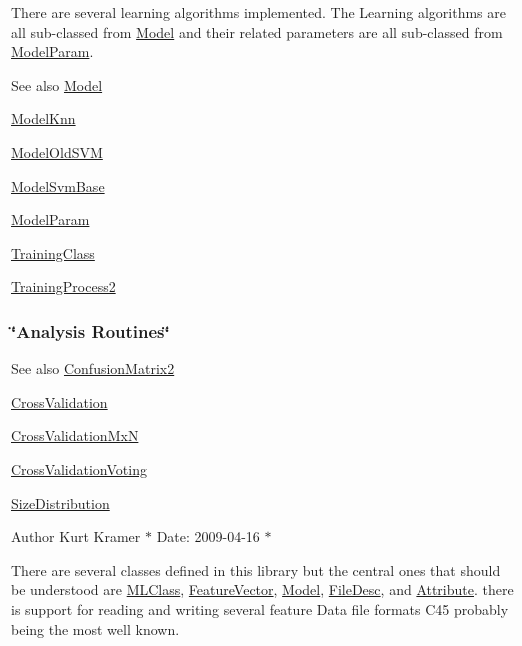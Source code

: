 There are several learning algorithms implemented. The Learning algorithms are all sub-\/classed from \textquotesingle{}\hyperlink{class_k_k_m_l_l_1_1_model}{Model}\textquotesingle{} and their related parameters are all sub-\/classed from \textquotesingle{}\hyperlink{class_k_k_m_l_l_1_1_model_param}{Model\+Param}\textquotesingle{}. \begin{DoxySeeAlso}{See also}
\hyperlink{class_k_k_m_l_l_1_1_model}{Model} 

\hyperlink{class_k_k_m_l_l_1_1_model_knn}{Model\+Knn} 

\hyperlink{class_k_k_m_l_l_1_1_model_old_s_v_m}{Model\+Old\+S\+VM} 

\hyperlink{class_k_k_m_l_l_1_1_model_svm_base}{Model\+Svm\+Base} 

\hyperlink{class_k_k_m_l_l_1_1_model_param}{Model\+Param} 

\hyperlink{class_k_k_m_l_l_1_1_training_class}{Training\+Class} 

\hyperlink{class_k_k_m_l_l_1_1_training_process2}{Training\+Process2}
\end{DoxySeeAlso}
\hypertarget{namespace_k_k_m_l_l_AnalysisRoutines}{}\subsubsection{\char`\"{}\+Analysis Routines\char`\"{}}\label{namespace_k_k_m_l_l_AnalysisRoutines}
\begin{DoxySeeAlso}{See also}
\hyperlink{class_k_k_m_l_l_1_1_confusion_matrix2}{Confusion\+Matrix2} 

\hyperlink{class_k_k_m_l_l_1_1_cross_validation}{Cross\+Validation} 

\hyperlink{class_k_k_m_l_l_1_1_cross_validation_mx_n}{Cross\+Validation\+MxN} 

\hyperlink{class_k_k_m_l_l_1_1_cross_validation_voting}{Cross\+Validation\+Voting} 

\hyperlink{class_k_k_m_l_l_1_1_size_distribution}{Size\+Distribution}
\end{DoxySeeAlso}
\begin{DoxyAuthor}{Author}
Kurt Kramer $\ast$ Date\+: 2009-\/04-\/16 $\ast$
\end{DoxyAuthor}
There are several classes defined in this library but the central ones that should be understood are \hyperlink{class_k_k_m_l_l_1_1_m_l_class}{M\+L\+Class}, \hyperlink{class_k_k_m_l_l_1_1_feature_vector}{Feature\+Vector}, \hyperlink{class_k_k_m_l_l_1_1_model}{Model}, \hyperlink{class_k_k_m_l_l_1_1_file_desc}{File\+Desc}, and \hyperlink{class_k_k_m_l_l_1_1_attribute}{Attribute}. there is support for reading and writing several feature Data file formats C45 probably being the most well known.

